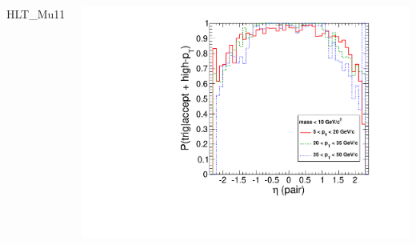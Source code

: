 \documentclass[compress]{beamer}
\begin{document}
\begin{frame}
\begin{columns}
\centering HLT\_Mu11

\includegraphics[width=\linewidth]{eta_mass10cut_pluscut_Mu11.pdf}
\end{columns}
\end{frame}

\end{document}
